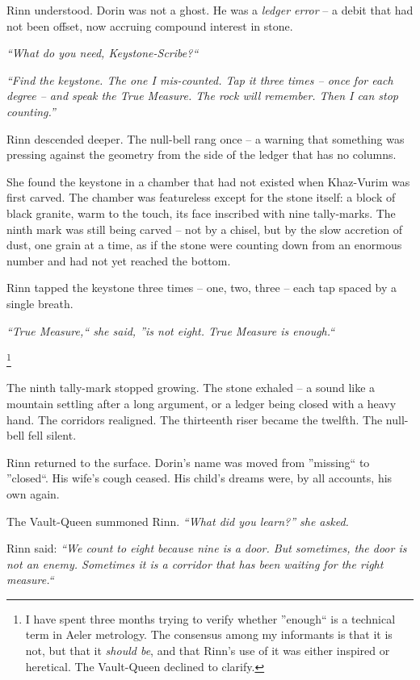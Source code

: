\documentclass[12pt]{article}
\begin{document}
Rinn understood. Dorin was not a ghost. He was a \textit{ledger error} -- a debit that had not been offset, now accruing compound interest in stone.

\textit{``What do you need, Keystone-Scribe?``}

\textit{``Find the keystone. The one I mis-counted. Tap it three times -- once for each degree -- and speak the True Measure. The rock will remember. Then I can stop counting.''}

Rinn descended deeper. The null-bell rang once -- a warning that something was pressing against the geometry from the side of the ledger that has no columns.

She found the keystone in a chamber that had not existed when Khaz-Vurim was first carved. The chamber was featureless except for the stone itself: a block of black granite, warm to the touch, its face inscribed with nine tally-marks. The ninth mark was still being carved -- not by a chisel, but by the slow accretion of dust, one grain at a time, as if the stone were counting down from an enormous number and had not yet reached the bottom.

Rinn tapped the keystone three times -- one, two, three -- each tap spaced by a single breath.

\textit{``True Measure,`` she said, ''is not eight. True Measure is \textit{enough}.``}

\footnote{I have spent three months trying to verify whether ''enough`` is a technical term in Aeler metrology. The consensus among my informants is that it is not, but that it \textit{should be}, and that Rinn's use of it was either inspired or heretical. The Vault-Queen declined to clarify.}

The ninth tally-mark stopped growing. The stone exhaled -- a sound like a mountain settling after a long argument, or a ledger being closed with a heavy hand. The corridors realigned. The thirteenth riser became the twelfth. The null-bell fell silent.

Rinn returned to the surface. Dorin's name was moved from ''missing`` to ''closed``. His wife's cough ceased. His child's dreams were, by all accounts, his own again.

The Vault-Queen summoned Rinn. \textit{``What did you learn?'' she asked.}

Rinn said: \textit{``We count to eight because nine is a door. But sometimes, the door is not an enemy. Sometimes it is a corridor that has been waiting for the right measure.``}
\end{document}
